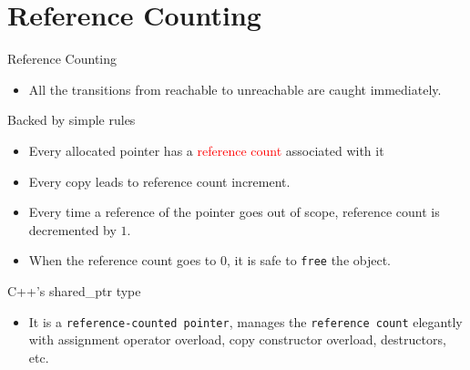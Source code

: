\documentclass[
  10pt,
  ignorenonframetext,
]{beamer}
\providecommand{\tightlist}{%
  \setlength{\itemsep}{0pt}\setlength{\parskip}{0pt}}
\begin{document}
\hypertarget{reference-counting}{%
\section{Reference
Counting}\label{reference-counting}}

\begin{frame}{Reference Counting}
\pause

\begin{itemize}
\tightlist
\item
  All the transitions from reachable to
  unreachable are caught immediately. \pause
\end{itemize}

\begin{block}{Backed by simple rules}
\protect\hypertarget{backed-by-simple-rules}{}
\pause

\begin{itemize}
\tightlist
\item
  Every allocated pointer has a
  \textcolor{red}{reference count} associated with
  it \pause
\item
  Every copy leads to reference count increment.
  \pause
\item
  Every time a reference of the pointer goes out
  of scope, reference count is decremented by
  \(1\). \pause
\item
  When the reference count goes to \(0\), it is
  safe to \texttt{free} the object.
\end{itemize}
\end{block}
\end{frame}

\begin{frame}{C++'s shared\_ptr type}
\protect\hypertarget{cs-shared_ptr-type}{}
\pause

\begin{itemize}
\tightlist
\item
  It is a \texttt{reference-counted pointer},
  manages the \texttt{reference count} elegantly
  with assignment operator overload, copy
  constructor overload, destructors, etc.
\end{itemize}
\end{frame}
\end{document}

